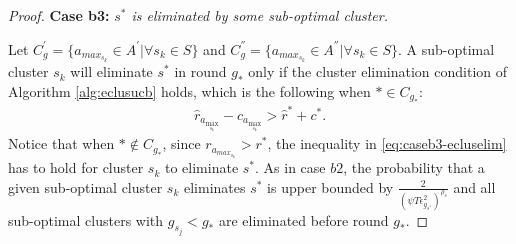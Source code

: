 \begin{proof}




\textbf{Case b3:} \textit{$s^{*}$ is eliminated by some sub-optimal cluster.} 

Let $C_{g}^{'}=\lbrace a_{max_{s_{k}}}\in A^{'}|\forall s_{k}\in S \rbrace$ and $C_{g}^{''}=\lbrace a_{max_{s_{k}}}\in A^{''}|\forall s_{k}\in S \rbrace$. A sub-optimal cluster $s_k$ will eliminate $s^*$ in round $g_*$ only if the cluster elimination condition of Algorithm \ref{alg:eclusucb} holds, which is the following when ${*}\in C_{g_{*}}$:
\begin{align}
\hat r_{a_{\max_{s_k}}} - c_{a_{\max_{s_k}}} > \hat{r}^{*}+ c^{*}.
\label{eq:caseb3-ecluselim}
\end{align}
Notice that when ${*}\notin C_{g_{*}}$, since $r_{a_{max_{s_{k}}}}>r^{*}$, the inequality in \eqref{eq:caseb3-ecluselim} has to hold for cluster $s_k$ to eliminate $s^*$.
As in case $b2$, the probability that a given sub-optimal cluster $s_k$ eliminates $s^*$ is upper bounded by  $\frac{2}{(\psi T\epsilon_{g_{s^{*}}}^{2})^{\rho_{s}}}$ and all sub-optimal clusters with $g_{s_{j}}< g_{*}$ are eliminated before round $g_*$. 


\end{proof}
